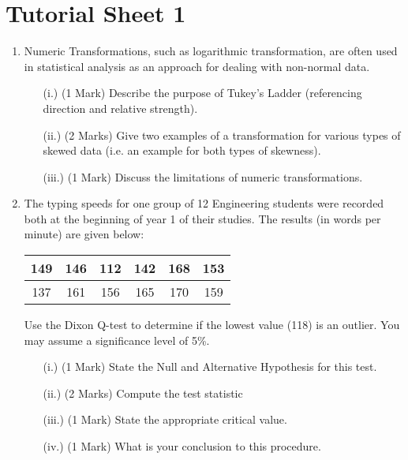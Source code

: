 \documentclass[]{report}
\begin{document}
\section*{Tutorial Sheet 1}
\begin{enumerate}
\item 
Numeric Transformations, such as logarithmic transformation, are often used in statistical analysis as an approach for dealing with non-normal data.
\begin{itemize}
	\item[(i.)] (1 Mark) Describe the purpose of Tukey's Ladder (referencing direction and relative strength).
	\item[(ii.)] (2 Marks) Give two examples of a transformation for various types of skewed data (i.e. an example for both types of skewness).
	\item[(iii.)] (1 Mark) Discuss the limitations of numeric transformations.
\end{itemize}
\bigskip

\item 
The typing speeds for one group of 12 Engineering students were recorded both at the beginning of year 1 of their studies. The results (in words per minute) are given below:

\begin{center}
	\begin{tabular}{|c|c|c|c|c|c|}
		\hline
		149  & 146 & 112 & 142 & 168& 153\\ \hline
		137 & 161 & 156& 165&  170&  159
		\\ \hline
	\end{tabular}
\end{center}
Use the Dixon Q-test to determine if the lowest value (118) is an outlier. You may assume a significance level of 5\%.
\begin{itemize}
	\item[(i.)](1 Mark)	State the Null and Alternative Hypothesis for this test.
	\item[(ii.)](2 Marks) Compute the test statistic
	\item[(iii.)](1 Mark) State the appropriate critical value.
	\item[(iv.)](1 Mark) What is your conclusion to this procedure.
\end{itemize}


\end{enumerate}
\end{document}

